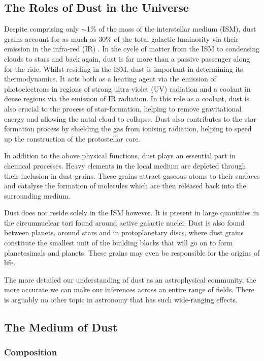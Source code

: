 \subsection{The Roles of Dust in the Universe}

Despite comprising only $\sim$1\% of the mass of the interstellar medium (ISM), dust grains account for as much as 30\% of the total galactic luminosity via their emission in the infra-red (IR) \citep{Li2003}.  In the cycle of matter from the ISM to condensing clouds to stars and back again, dust is far more than a passive passenger along for the ride.  Whilst residing in the ISM, dust is important in determining its thermodynamics.  It acts both as a heating agent via the emission of photoelectrons in regions of strong ultra-violet (UV) radiation and a coolant in dense regions via the emission of IR radiation.  In this role as a coolant, dust is also crucial to the process of star-formation, helping to remove gravitational energy and allowing the natal cloud to collapse.  Dust also contributes to the star formation process by shielding the gas from ionising radiation, helping to speed up the construction of the protostellar core. 

In addition to the above physical functions, dust plays an essential part in chemical processes.  Heavy elements in the local medium are depleted through their inclusion in dust grains.  These grains  attract gaseous atoms to their surfaces and catalyse the formation of molecules which are then released back into the surrounding medium.

Dust does not reside solely in the ISM however.  It is present in  large quantities in the circumnuclear tori found around active galactic nuclei.  Dust is also found between planets, around stars and in protoplanetary discs, where dust grains constitute the smallest unit of the building blocks that will go on to form planetesimals and planets.  These grains may even be responsible for the origins of life.  

The more detailed our understanding of dust as an astrophysical community, the more accurate we can make our inferences across an entire range of  fields.  There is arguably no other topic in astronomy that has such wide-ranging effects.


\subsection{The Medium of Dust}

\subsubsection{Composition}

